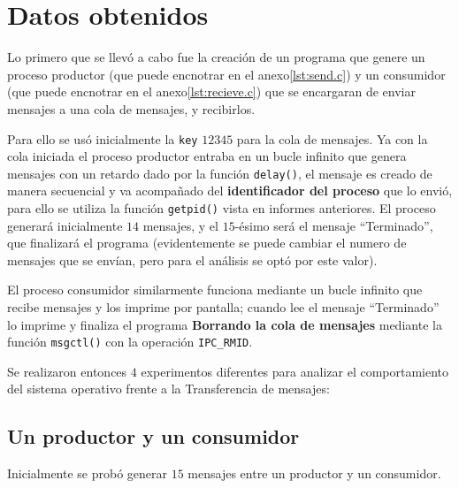 \section{Datos obtenidos}
Lo primero que se llevó a cabo fue la creación de un programa que genere un proceso productor (que puede encnotrar en el anexo\ref{lst:send.c}) y un consumidor (que puede encnotrar en el anexo\ref{lst:recieve.c}) que se encargaran de enviar mensajes a una cola de mensajes, y recibirlos.

Para ello se usó inicialmente la \texttt{key} $12345$ para la cola de mensajes. Ya con la cola iniciada el proceso productor entraba en un bucle infinito que genera mensajes con un retardo dado por la función \texttt{delay()}, el mensaje es creado de manera secuencial y va acompañado del \textbf{identificador del proceso} que lo envió, para ello se utiliza la función \texttt{getpid()} vista en informes anteriores. El proceso generará inicialmente $14$ mensajes, y el $15$-ésimo será el mensaje ``Terminado'', que finalizará el programa (evidentemente se puede cambiar el numero de mensajes que se envían, pero para el análisis se optó por este valor).

El proceso consumidor similarmente funciona mediante un bucle infinito que recibe mensajes y los imprime por pantalla; cuando lee el mensaje ``Terminado'' lo imprime y finaliza el programa \textbf{Borrando la cola de mensajes} mediante la función \texttt{msgctl()} con la operación \texttt{IPC\_RMID}.

Se realizaron entonces $4$ experimentos diferentes para analizar el comportamiento del sistema operativo frente a la Transferencia de mensajes:

\subsection{Un productor y un consumidor}
Inicialmente se probó generar $15$ mensajes entre un productor y un consumidor.

